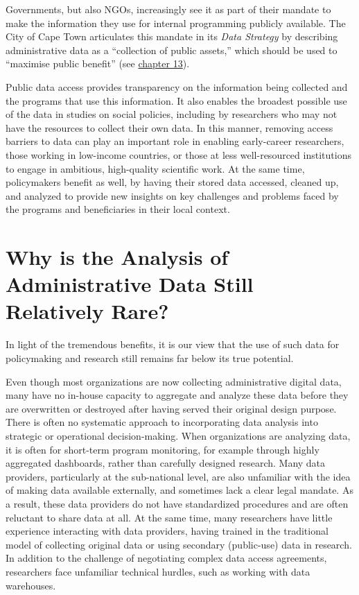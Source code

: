 Governments, but also NGOs, increasingly see it as part of their mandate to make the information they use for internal programming publicly available. The City of Cape Town articulates this mandate in its \emph{Data Strategy} by describing administrative data as a ``collection of public assets,'' which should be used to ``maximise public benefit'' (see \protect\hyperlink{cct}{chapter 13}).

Public data access provides transparency on the information being collected and the programs that use this information. It also enables the broadest possible use of the data in studies on social policies, including by researchers who may not have the resources to collect their own data. In this manner, removing access barriers to data can play an important role in enabling early-career researchers, those working in low-income countries, or those at less well-resourced institutions to engage in ambitious, high-quality scientific work. At the same time, policymakers benefit as well, by having their stored data accessed, cleaned up, and analyzed to provide new insights on key challenges and problems faced by the programs and beneficiaries in their local context.

\hypertarget{why-is-the-analysis-of-administrative-data-still-relatively-rare}{%
\section{Why is the Analysis of Administrative Data Still Relatively Rare?}\label{why-is-the-analysis-of-administrative-data-still-relatively-rare}}

In light of the tremendous benefits, it is our view that the use of such data for policymaking and research still remains far below its true potential.

Even though most organizations are now collecting administrative digital data, many have no in-house capacity to aggregate and analyze these data before they are overwritten or destroyed after having served their original design purpose. There is often no systematic approach to incorporating data analysis into strategic or operational decision-making. When organizations are analyzing data, it is often for short-term program monitoring, for example through highly aggregated dashboards, rather than carefully designed research. Many data providers, particularly at the sub-national level, are also unfamiliar with the idea of making data available externally, and sometimes lack a clear legal mandate. As a result, these data providers do not have standardized procedures and are often reluctant to share data at all. At the same time, many researchers have little experience interacting with data providers, having trained in the traditional model of collecting original data or using secondary (public-use) data in research. In addition to the challenge of negotiating complex data access agreements, researchers face unfamiliar technical hurdles, such as working with data warehouses.

